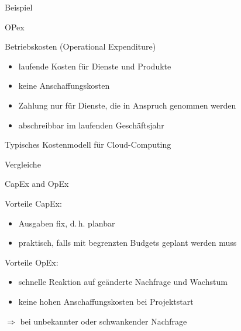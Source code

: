\documentclass{scrartcl}
\newenvironment{flashcard}[2][]{%
    #1
    \vfill
    \centerline{\Large{#2}}
    \vfill
    \newpage
}
{\newpage}
\begin{document}
    \begin{flashcard}[Beispiel]{OPex}
        Betriebskosten (Operational Expenditure)
        \begin{itemize}
            \item laufende Kosten für Dienste und Produkte
            \item keine Anschaffungskosten
            \item Zahlung nur für Dienste, die in Anspruch genommen werden
            \item abschreibbar im laufenden Geschäftsjahr
        \end{itemize}

        Typisches Kostenmodell für Cloud-Computing
    \end{flashcard}

    \begin{flashcard}[Vergleiche]{CapEx and OpEx}
        Vorteile CapEx:
        \begin{itemize}
            \item Ausgaben fix, d.\,h. planbar
            \item praktisch, falls mit begrenzten Budgets geplant werden muss
        \end{itemize}
        
        Vorteile OpEx:
        \begin{itemize}
            \item schnelle Reaktion auf geänderte Nachfrage und Wachstum
            \item keine hohen Anschaffungskosten bei Projektstart
        \end{itemize}
        $\Rightarrow$ bei unbekannter oder schwankender Nachfrage

    \end{flashcard}
\end{document}

